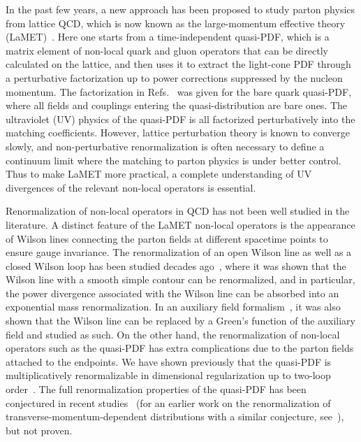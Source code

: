 \documentclass[prd,aps,twocolumn,preprintnumbers, showpacs, nofootinbib,superscriptaddress,notitlepage]{revtex4-1}
\begin{document}
In the past few years, a new approach has been proposed to study parton physics from lattice QCD, which is now known as the large-momentum effective theory (LaMET)~\cite{Ji:2013dva,Ji:2014gla}. Here one starts from a time-independent quasi-PDF, which is a matrix element of non-local quark and gluon operators that can be directly calculated on the lattice, and then uses it to extract the light-cone PDF through a perturbative factorization up to power corrections suppressed by the nucleon momentum. The factorization in Refs.~\cite{Ji:2013dva,Xiong:2013bka} was given for the bare quark quasi-PDF, where all fields and couplings entering the quasi-distribution are bare ones.
The ultraviolet (UV) physics of the quasi-PDF is all factorized perturbatively into the matching coefficients. However, lattice perturbation theory is known to converge slowly, and non-perturbative renormalization is often necessary to define a continuum limit where the matching to
parton physics is under better control. Thus to make LaMET more practical, a complete understanding of UV divergences of the relevant non-local operators
is essential.

Renormalization of non-local operators in QCD has not been well studied in the literature. A distinct feature of the LaMET non-local operators is the appearance of Wilson lines connecting the parton fields at different spacetime points to ensure gauge invariance.
The renormalization of an open Wilson line as well as a closed Wilson loop has been studied decades ago~\cite{Dotsenko:1979wb,Craigie:1980qs,Dorn:1986dt}, where it was shown that the Wilson line with a smooth simple contour can be renormalized, and in particular, the power divergence associated with the Wilson line can be absorbed into an exponential mass renormalization. In an auxiliary field formalism~\cite{Dorn:1986dt}, it was also shown that the Wilson line can be replaced by a Green's function of the auxiliary field and studied as such. On the other hand, the renormalization of non-local operators such as the quasi-PDF has extra complications due to the parton fields attached to the endpoints.  
We have shown previously that the quasi-PDF is multiplicatively renormalizable in dimensional regularization up to two-loop order~\cite{Ji:2015jwa}.
The full renormalization properties of the quasi-PDF has been conjectured in recent studies~\cite{Ishikawa:2016znu,Chen:2016fxx,Constantinou:2017sej,Alexandrou:2017huk,Chen:2017mzz,Stewart:2017ss} (for an earlier work on the renormalization of transverse-momentum-dependent distributions with a similar conjecture, see~\cite{Musch:2010ka}),
but not proven.
\end{document}
